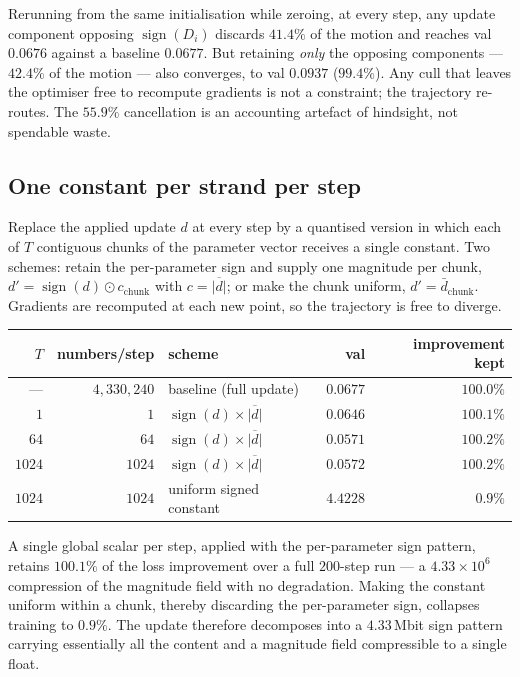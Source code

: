 \begin{observation}
Rerunning from the same initialisation while zeroing, at every step, any update
component opposing $\operatorname{sign}(D_i)$ discards $41.4\%$ of the motion
and reaches val $0.0676$ against a baseline $0.0677$. But retaining
\emph{only} the opposing components --- $42.4\%$ of the motion --- also
converges, to val $0.0937$ ($99.4\%$). Any cull that leaves the optimiser free
to recompute gradients is not a constraint; the trajectory re-routes. The
$55.9\%$ cancellation is an accounting artefact of hindsight, not spendable
waste.
\end{observation}

\subsection{One constant per strand per step}

Replace the applied update $d$ at every step by a quantised version in which
each of $T$ contiguous chunks of the parameter vector receives a single
constant. Two schemes: retain the per-parameter sign and supply one magnitude
per chunk, $d' = \operatorname{sign}(d)\odot c_{\text{chunk}}$ with
$c = \overline{|d|}$; or make the chunk uniform, $d' = \bar d_{\text{chunk}}$.
Gradients are recomputed at each new point, so the trajectory is free to
diverge.

\begin{center}
\begin{tabular}{rrlrr}
\toprule
$T$ & numbers/step & scheme & val & improvement kept \\
\midrule
--- & $4{,}330{,}240$ & baseline (full update) & $0.0677$ & $100.0\%$ \\
$1$    & $1$    & $\operatorname{sign}(d)\times\overline{|d|}$ & $0.0646$ & $100.1\%$ \\
$64$   & $64$   & $\operatorname{sign}(d)\times\overline{|d|}$ & $0.0571$ & $100.2\%$ \\
$1024$ & $1024$ & $\operatorname{sign}(d)\times\overline{|d|}$ & $0.0572$ & $100.2\%$ \\
$1024$ & $1024$ & uniform signed constant & $4.4228$ & $0.9\%$ \\
\bottomrule
\end{tabular}
\end{center}

\begin{proposition}
A single global scalar per step, applied with the per-parameter sign pattern,
retains $100.1\%$ of the loss improvement over a full $200$-step run --- a
$4.33\times10^{6}$ compression of the magnitude field with no degradation.
Making the constant uniform within a chunk, thereby discarding the
per-parameter sign, collapses training to $0.9\%$. The update therefore
decomposes into a $4.33$\,Mbit sign pattern carrying essentially all the
content and a magnitude field compressible to a single float.
\end{proposition}

